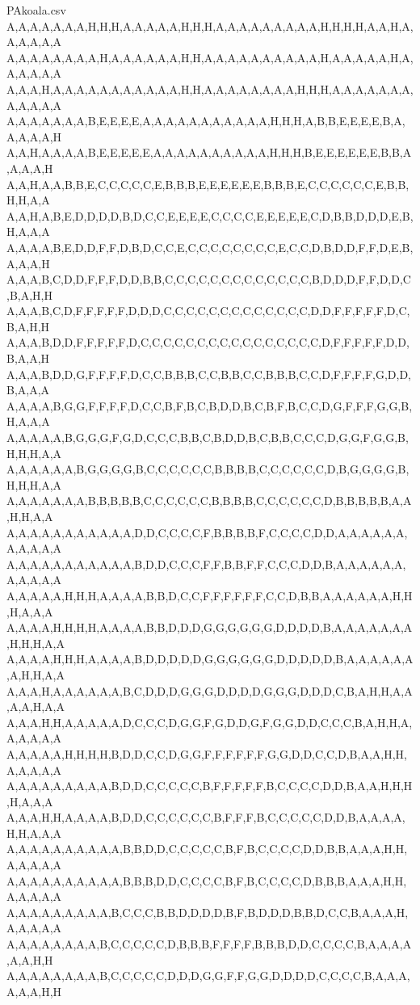\documentclass[english,parskip=half-,paper=a4]{scrartcl}
\begin{document}
\begin{codeblock}[title=Useful data]
\begin{filecontents*}[overwrite]{PAkoala.csv}
A,A,A,A,A,A,A,H,H,H,A,A,A,A,A,H,H,H,A,A,A,A,A,A,A,A,A,H,H,H,H,A,A,H,A,A,A,A,A,A
A,A,A,A,A,A,A,A,H,A,A,A,A,A,A,H,H,A,A,A,A,A,A,A,A,A,A,H,A,A,A,A,A,H,A,A,A,A,A,A
A,A,A,H,A,A,A,A,A,A,A,A,A,A,A,H,H,A,A,A,A,A,A,A,A,H,H,H,A,A,A,A,A,A,A,A,A,A,A,A
A,A,A,A,A,A,A,B,E,E,E,E,A,A,A,A,A,A,A,A,A,A,A,H,H,H,A,B,B,E,E,E,E,B,A,A,A,A,A,H
A,A,H,A,A,A,A,B,E,E,E,E,E,A,A,A,A,A,A,A,A,A,A,H,H,H,B,E,E,E,E,E,E,B,B,A,A,A,A,H
A,A,H,A,A,B,B,E,C,C,C,C,C,E,B,B,B,E,E,E,E,E,E,B,B,B,E,C,C,C,C,C,C,E,B,B,H,H,A,A
A,A,H,A,B,E,D,D,D,D,B,D,C,C,E,E,E,E,C,C,C,C,E,E,E,E,E,C,D,B,B,D,D,D,E,B,H,A,A,A
A,A,A,A,B,E,D,D,F,F,D,B,D,C,C,E,C,C,C,C,C,C,C,C,E,C,C,D,B,D,D,F,F,D,E,B,A,A,A,H
A,A,A,B,C,D,D,F,F,F,D,D,B,B,C,C,C,C,C,C,C,C,C,C,C,C,C,B,D,D,D,F,F,D,D,C,B,A,H,H
A,A,A,B,C,D,F,F,F,F,F,D,D,D,C,C,C,C,C,C,C,C,C,C,C,C,C,D,D,F,F,F,F,F,D,C,B,A,H,H
A,A,A,B,D,D,F,F,F,F,F,D,C,C,C,C,C,C,C,C,C,C,C,C,C,C,C,C,D,F,F,F,F,F,D,D,B,A,A,H
A,A,A,B,D,D,G,F,F,F,F,D,C,C,B,B,B,C,C,B,B,C,C,B,B,B,C,C,D,F,F,F,F,G,D,D,B,A,A,A
A,A,A,A,B,G,G,F,F,F,F,D,C,C,B,F,B,C,B,D,D,B,C,B,F,B,C,C,D,G,F,F,F,G,G,B,H,A,A,A
A,A,A,A,A,B,G,G,G,F,G,D,C,C,C,B,B,C,B,D,D,B,C,B,B,C,C,C,D,G,G,F,G,G,B,H,H,H,A,A
A,A,A,A,A,A,B,G,G,G,G,B,C,C,C,C,C,C,B,B,B,B,C,C,C,C,C,C,D,B,G,G,G,G,B,H,H,H,A,A
A,A,A,A,A,A,A,B,B,B,B,B,C,C,C,C,C,C,B,B,B,B,C,C,C,C,C,C,D,B,B,B,B,B,A,A,H,H,A,A
A,A,A,A,A,A,A,A,A,A,A,D,D,C,C,C,C,F,B,B,B,B,F,C,C,C,C,D,D,A,A,A,A,A,A,A,A,A,A,A
A,A,A,A,A,A,A,A,A,A,A,B,D,D,C,C,C,F,F,B,B,F,F,C,C,C,D,D,B,A,A,A,A,A,A,A,A,A,A,A
A,A,A,A,A,H,H,H,A,A,A,A,B,B,D,C,C,F,F,F,F,F,F,C,C,D,B,B,A,A,A,A,A,A,H,H,H,A,A,A
A,A,A,A,H,H,H,H,A,A,A,A,B,B,D,D,D,G,G,G,G,G,G,D,D,D,D,B,A,A,A,A,A,A,A,H,H,H,A,A
A,A,A,A,H,H,H,A,A,A,A,B,D,D,D,D,D,G,G,G,G,G,G,D,D,D,D,D,B,A,A,A,A,A,A,A,H,H,A,A
A,A,A,H,A,A,A,A,A,A,B,C,D,D,D,G,G,G,D,D,D,D,G,G,G,D,D,D,C,B,A,H,H,A,A,A,A,H,A,A
A,A,A,H,H,A,A,A,A,A,D,C,C,C,D,G,G,F,G,D,D,G,F,G,G,D,D,C,C,C,B,A,H,H,A,A,A,A,A,A
A,A,A,A,A,H,H,H,H,B,D,D,C,C,D,G,G,F,F,F,F,F,F,G,G,D,D,C,C,D,B,A,A,H,H,A,A,A,A,A
A,A,A,A,A,A,A,A,A,B,D,D,C,C,C,C,C,B,F,F,F,F,F,B,C,C,C,C,D,D,B,A,A,H,H,H,H,A,A,A
A,A,A,H,H,A,A,A,A,B,D,D,C,C,C,C,C,C,B,F,F,F,B,C,C,C,C,C,D,D,B,A,A,A,A,H,H,A,A,A
A,A,A,A,A,A,A,A,A,A,B,B,D,D,C,C,C,C,C,B,F,B,C,C,C,C,D,D,B,B,A,A,A,H,H,A,A,A,A,A
A,A,A,A,A,A,A,A,A,A,B,B,B,D,D,C,C,C,C,B,F,B,C,C,C,C,D,B,B,B,A,A,A,H,H,A,A,A,A,A
A,A,A,A,A,A,A,A,A,B,C,C,C,B,B,D,D,D,D,B,F,B,D,D,D,B,B,D,C,C,B,A,A,A,H,A,A,A,A,A
A,A,A,A,A,A,A,A,B,C,C,C,C,C,D,B,B,B,F,F,F,F,B,B,B,D,D,C,C,C,C,B,A,A,A,A,A,A,H,H
A,A,A,A,A,A,A,A,B,C,C,C,C,C,D,D,D,G,G,F,F,G,G,D,D,D,D,C,C,C,C,B,A,A,A,A,A,A,H,H

\end{filecontents*}
\end{codeblock}
\end{document}
